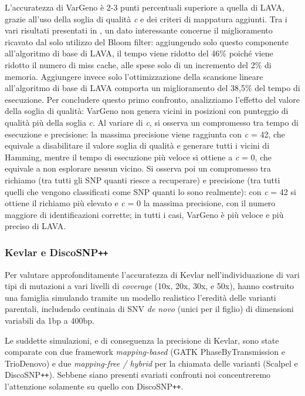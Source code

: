 \documentclass[../main.tex]{subfiles}
\begin{document}
L'accuratezza di VarGeno è 2-3 punti percentuali superiore a quella di LAVA, grazie all'uso della soglia di qualità \textit{c} e dei criteri di mappatura aggiunti. Tra i vari risultati presentati in \cite{sun-medvedev2018vargeno}, un dato interessante concerne il miglioramento ricavato dal solo utilizzo del Bloom filter: aggiungendo solo questo componente all'algoritmo di base di LAVA, il tempo viene ridotto del 46\% poiché viene ridotto il numero di miss cache, alle spese solo di un incremento del 2\% di memoria. Aggiungere invece solo l'ottimizzazione della scansione lineare all'algoritmo di base di LAVA comporta un miglioramento del 38,5\% del tempo di esecuzione. Per concludere questo primo confronto, analizziamo l'effetto del valore della soglia di qualità: VarGeno non genera vicini in posizioni con punteggio di qualità più della soglia \textit{c}. Al variare di \textit{c}, si osserva un compromesso tra tempo di esecuzione e precisione: la massima precisione viene raggiunta con \textit{c} = 42, che equivale a disabilitare il valore soglia di qualità e generare tutti i vicini di Hamming, mentre il tempo di esecuzione più veloce si ottiene a \textit{c} = 0, che equivale a non esplorare nessun vicino. Si osserva poi un compromesso tra richiamo (tra tutti gli SNP quanti riesce a recuperare) e precisione (tra tutti quelli che vengono classificati come SNP quanti lo sono realmente): con \textit{c} = 42 si ottiene il richiamo più elevato e \textit{c} = 0 la massima precisione, con il numero maggiore di identificazioni corrette; in tutti i casi, VarGeno è più veloce e più preciso di LAVA. 

\subsubsection{Kevlar e DiscoSNP\texttt{++}}

Per valutare approfonditamente l'accuratezza di Kevlar nell'individuazione di vari tipi di mutazioni a vari livelli di \textit{coverage} (10x, 20x, 30x, e 50x), \cite{standage2019kevlar} hanno costruito una famiglia simulando tramite un modello realistico l'eredità delle varianti parentali, includendo centinaia di SNV \textit{de novo} (unici per il figlio) di dimensioni variabili da 1bp a 400bp. 

Le suddette simulazioni, e di conseguenza la precisione di Kevlar, sono state comparate con due framework \textit{mapping-based} (GATK PhaseByTransmission e TrioDenovo) e due \textit{mapping-free / hybrid} per la chiamata delle varianti (Scalpel e DiscoSNP\texttt{++}). Sebbene siano presenti svariati confronti noi concentreremo l'attenzione solamente su quello con DiscoSNP\texttt{++}. 
\end{document}
